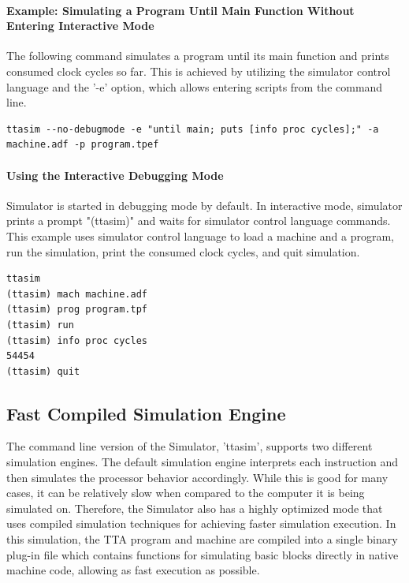 \documentclass[a4paper,twoside]{tceusermanual}
\begin{document}
\paragraph{Example: Simulating a Program Until Main Function Without
Entering Interactive Mode}

The following command simulates a program until its main function and
prints consumed clock cycles so far. This is achieved by utilizing the simulator
control language and the '-e' option, which allows entering scripts 
from the command line.

\begin{verbatim}
ttasim --no-debugmode -e "until main; puts [info proc cycles];" -a machine.adf -p program.tpef
\end{verbatim}

\paragraph{Using the Interactive Debugging Mode}

Simulator is started in debugging mode by default. In interactive mode,
simulator prints a prompt "(ttasim)" and waits for simulator control language
commands. This example uses simulator control language to load a machine and a
program, run the simulation, print the consumed clock cycles, and quit
simulation.

\begin{verbatim}
ttasim
(ttasim) mach machine.adf
(ttasim) prog program.tpf
(ttasim) run
(ttasim) info proc cycles
54454
(ttasim) quit
\end{verbatim}

\subsection{Fast Compiled Simulation Engine}

The command line version of the Simulator, 'ttasim', supports two
different simulation engines. The default simulation engine interprets each
instruction and then simulates the processor behavior accordingly. While this is
good for many cases, it can be relatively slow when compared to the computer it
is being simulated on. Therefore, the Simulator also has a highly optimized 
mode that uses compiled simulation techniques for achieving faster simulation
execution. In this simulation, the TTA program and machine are compiled
into a single binary plug-in file which contains functions for simulating basic
blocks directly in native machine code, allowing as fast execution as possible.
\end{document}
